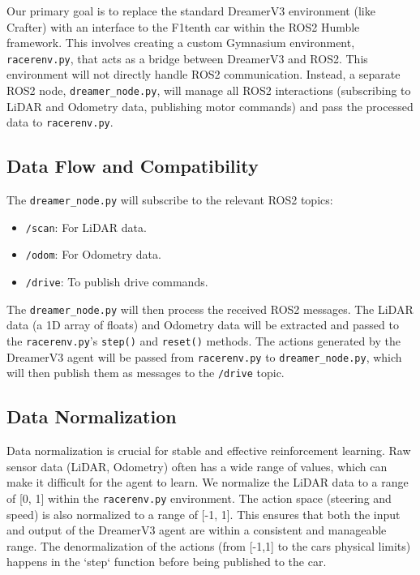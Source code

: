Our primary goal is to replace the standard DreamerV3 environment (like Crafter) with an interface to the F1tenth car within the ROS2 Humble framework.  This involves creating a custom Gymnasium environment, \texttt{racerenv.py}, that acts as a bridge between DreamerV3 and ROS2.  This environment will not directly handle ROS2 communication.  Instead, a separate ROS2 node, \texttt{dreamer\_node.py}, will manage all ROS2 interactions (subscribing to LiDAR and Odometry data, publishing motor commands) and pass the processed data to \texttt{racerenv.py}.

\subsection{Data Flow and Compatibility}

The \texttt{dreamer\_node.py} will subscribe to the relevant ROS2 topics:
\begin{itemize}
    \item \texttt{/scan}:  For LiDAR data.
    \item \texttt{/odom}: For Odometry data.
    \item \texttt{/drive}: To publish drive commands.
\end{itemize}

The \texttt{dreamer\_node.py} will then process the received ROS2 messages.  The LiDAR data (a 1D array of floats) and Odometry data will be extracted and passed to the \texttt{racerenv.py}'s \texttt{step()} and \texttt{reset()} methods.  The actions generated by the DreamerV3 agent will be passed from \texttt{racerenv.py} to \texttt{dreamer\_node.py}, which will then publish them as messages to the \texttt{/drive} topic.

\subsection{Data Normalization}

Data normalization is crucial for stable and effective reinforcement learning.  Raw sensor data (LiDAR, Odometry) often has a wide range of values, which can make it difficult for the agent to learn.  We normalize the LiDAR data to a range of [0, 1] within the \texttt{racerenv.py} environment.  The action space (steering and speed) is also normalized to a range of [-1, 1]. This ensures that both the input and output of the DreamerV3 agent are within a consistent and manageable range.  The denormalization of the actions (from [-1,1] to the cars physical limits) happens in the `step` function before being published to the car.


